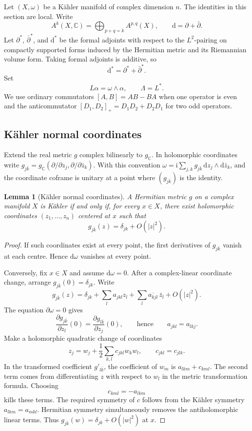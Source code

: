 \documentclass[11pt,reqno]{amsart}
\newtheorem{lemma}[theorem]{Lemma}
\theoremstyle{definition}
\theoremstyle{remark}
\newcommand{\C}{\mathbb{C}}
\newcommand{\dd}{\mathrm{d}}
\newcommand{\ii}{\mathrm{i}}
\newcommand{\dbar}{\bar\partial}
\begin{document}
Let $(X,\omega)$ be a K\"ahler manifold of complex dimension $n$.
The identities in this section are local. Write
\[
A^k(X,\C)=\bigoplus_{p+q=k}A^{p,q}(X),
\qquad
\dd=\partial+\dbar.
\]
Let $\partial^*$, $\dbar^*$, and $\dd^*$ be the formal adjoints with respect to
the $L^2$-pairing on compactly supported forms induced by the Hermitian metric
and its Riemannian volume form. Taking formal adjoints is additive, so
\[
\dd^*=\partial^*+\dbar^*.
\]
Set
\[
L\alpha=\omega\wedge\alpha,
\qquad
\Lambda=L^*.
\]
We use ordinary commutators $[A,B]=AB-BA$ when one operator is even and the
anticommutator $[D_1,D_2]_+=D_1D_2+D_2D_1$ for two odd operators.

\subsection{K\"ahler normal coordinates}

Extend the real metric $g$ complex bilinearly to $g_{\C}$. In holomorphic
coordinates write
$g_{j\bar k}=g_{\C}(\partial/\partial z_j,\partial/\partial\bar z_k)$.
With this convention $\omega=\ii\sum_{j,k}g_{j\bar k}\,\dd z_j\wedge
\dd\bar z_k$, and the coordinate coframe is unitary at a point where
$(g_{j\bar k})$ is the identity.

\begin{lemma}[K\"ahler normal coordinates]
\label{lem:normal-coords}
A Hermitian metric $g$ on a complex manifold $X$ is K\"ahler if and only if, for
every $x\in X$, there exist holomorphic coordinates $(z_1,\dots,z_n)$ centered
at $x$ such that
\[
g_{j\bar k}(z)=\delta_{jk}+O(|z|^2).
\]
\end{lemma}

\begin{proof}
If such coordinates exist at every point, the first derivatives of
$g_{j\bar k}$ vanish at each centre. Hence $\dd\omega$ vanishes at every
point.

Conversely, fix $x\in X$ and assume $\dd\omega=0$. After a complex-linear
coordinate change, arrange $g_{j\bar k}(0)=\delta_{jk}$. Write
\[
g_{j\bar k}(z)
=\delta_{jk}
+\sum_l a_{jkl}z_l
+\sum_l\overline{a_{kjl}}\,\bar z_l
+O(|z|^2).
\]
The equation $\partial\omega=0$ gives
\[
\frac{\partial g_{j\bar k}}{\partial z_l}(0)
=
\frac{\partial g_{l\bar k}}{\partial z_j}(0),
\qquad
\text{hence}
\qquad
a_{jkl}=a_{lkj}.
\]
Make a holomorphic quadratic change of coordinates
\[
z_j=w_j+\frac12\sum_{k,l}c_{jkl}w_kw_l,
\qquad c_{jkl}=c_{jlk}.
\]
In the transformed coefficient $g'_{l\bar k}$, the coefficient of $w_m$
is $a_{lkm}+c_{kml}$. The second term comes from differentiating $z$ with
respect to $w_l$ in the metric transformation formula. Choosing
\[
c_{kml}=-a_{lkm}
\]
kills these terms. The required symmetry of $c$ follows from the
K\"ahler symmetry $a_{lkm}=a_{mkl}$. Hermitian symmetry simultaneously removes
the antiholomorphic linear terms. Thus
$g_{j\bar k}(w)=\delta_{jk}+O(|w|^2)$ at $x$.
\end{proof}
\end{document}
